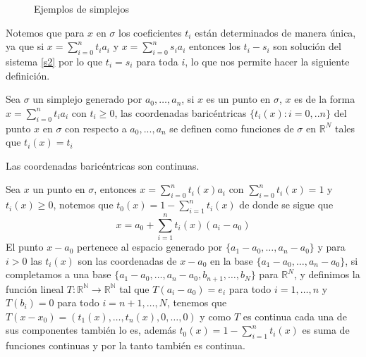 \begin{figure}[h]
\centering
{}
\caption{Ejemplos de simplejos}
\end{figure}

Notemos que para $x$ en $\sigma$ los coeficientes $t_i$ están determinados de manera única, ya que si $x = \sum_{i=0}^{n}t_ia_i$ y $x = \sum_{i=0}^{n}s_ia_i$ entonces los $t_i-s_i$ son solución del sistema \ref{s2} por lo que $t_i=s_i$ para toda $i$, lo que nos permite hacer la 
siguiente definición.
\begin{Defi}
Sea $\sigma$ un simplejo generado por $a_0,\ldots,a_n$, si $x$ es un punto en $\sigma$, $x$ es de la forma $x = \sum_{i=0}^{n}t_ia_i$ con $t_i\geqslant 0$, las coordenadas baricéntricas $\{t_i(x):i = 0,..n\}$ del punto $x$ en $\sigma$ con respecto a $a_0,...,a_n$ se definen como funciones de $\sigma$ en $\mathbb{R}^{N}$ tales que $t_i(x) = t_i$
\end{Defi}
\begin{Prop}
Las coordenadas baricéntricas son continuas.
\end{Prop}
\begin{Dem}

Sea $x$ un punto en $\sigma$, entonces $x=\sum_{i=0}^{n}t_i(x)a_i$ con $\sum_{i=0}^{n}t_i(x)=1$ y 
$t_i(x)\geq 0$, notemos que $t_0(x) = 1-\sum_{i=1}^{n}t_i(x)$ de donde se sigue que 
\begin{equation}
 x = a_0 + \sum_{i=1}^{n}t_i(x)(a_i-a_0)
\end{equation}
El punto $x-a_0$ pertenece al espacio generado por $\{a_1-a_0,\ldots,a_n-a_0\}$ y para $i>0$ las $t_i(x)$  son las coordenadas de $x-a_0$ en la base $\{a_1-a_0,\ldots,a_n-a_0\}$, si completamos a una base $\{a_1-a_0,\ldots,a_n-a_0,b_{n+1},\ldots,b_N\}$ para $\mathbb{R}^N$,  y definimos la función lineal $T\colon \mathbb{R^N}\rightarrow \mathbb{R^N}$ tal que $T(a_i-a_0) = e_i$ para todo $i=1,\ldots,n$ y $T(b_i) = 0$ para todo $i = n+1,\ldots,N$, tenemos que $T(x-x_0) = (t_1(x),\ldots,t_n(x),0,\ldots,0)$ y como $T$ es continua cada una de sus componentes también lo es, además $t_0(x) = 1-\sum_{i=1}^{n}t_i(x)$ es suma de funciones continuas y por la tanto también es continua. 
\end{Dem}
